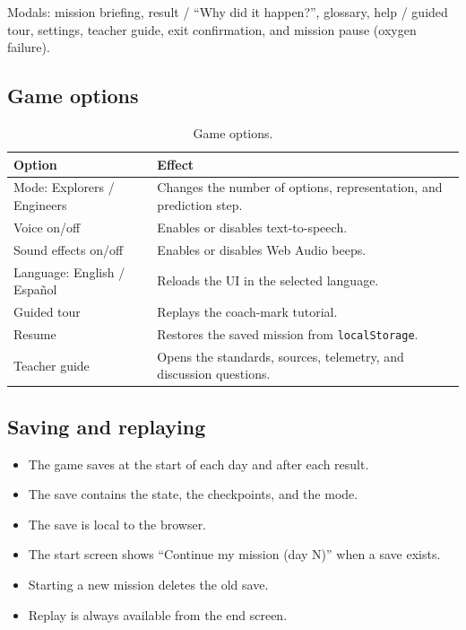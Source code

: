 \documentclass[11pt,a4paper]{article}
\newcommand{\code}[1]{\texttt{#1}}
\begin{document}
Modals: mission briefing, result / ``Why did it happen?'', glossary, help / guided tour, settings, teacher guide, exit confirmation, and mission pause (oxygen failure).

\subsection{Game options}

\begin{table}[H]
\centering
\small
\begin{tabular}{@{}p{4.2cm}p{10.2cm}@{}}
\toprule
\textbf{Option} & \textbf{Effect}\\
\midrule
Mode: Explorers / Engineers & Changes the number of options, representation, and prediction step.\\
Voice on/off & Enables or disables text-to-speech.\\
Sound effects on/off & Enables or disables Web Audio beeps.\\
Language: English / Espa\~nol & Reloads the UI in the selected language.\\
Guided tour & Replays the coach-mark tutorial.\\
Resume & Restores the saved mission from \code{localStorage}.\\
Teacher guide & Opens the standards, sources, telemetry, and discussion questions.\\
\bottomrule
\end{tabular}
\caption{Game options.}
\label{tab:options}
\end{table}

\subsection{Saving and replaying}

\begin{itemize}
  \item The game saves at the start of each day and after each result.
  \item The save contains the state, the checkpoints, and the mode.
  \item The save is local to the browser.
  \item The start screen shows ``Continue my mission (day N)'' when a save exists.
  \item Starting a new mission deletes the old save.
  \item Replay is always available from the end screen.
\end{itemize}
\end{document}
